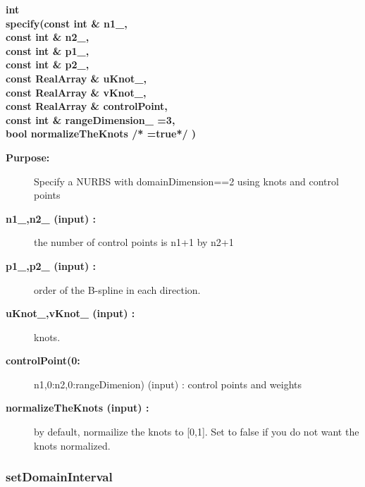 \begin{flushleft} \textbf{%
int  \\ 
\settowidth{\NurbsMappingIncludeArgIndent}{specify(}%
specify(const int \& n1\_, \\ 
\hspace{\NurbsMappingIncludeArgIndent}const int \& n2\_,\\ 
\hspace{\NurbsMappingIncludeArgIndent}const int \& p1\_, \\ 
\hspace{\NurbsMappingIncludeArgIndent}const int \& p2\_, \\ 
\hspace{\NurbsMappingIncludeArgIndent}const RealArray \& uKnot\_, \\ 
\hspace{\NurbsMappingIncludeArgIndent}const RealArray \& vKnot\_,\\ 
\hspace{\NurbsMappingIncludeArgIndent}const RealArray \& controlPoint,\\ 
\hspace{\NurbsMappingIncludeArgIndent}const int \& rangeDimension\_  =3,\\ 
\hspace{\NurbsMappingIncludeArgIndent}bool normalizeTheKnots /* =true*/  )
}\end{flushleft}
\begin{description}
\item[{\bf Purpose:}]  Specify a NURBS with domainDimension==2 using knots and control points
\item[{\bf n1\_,n2\_ (input) :}]  the number of control points is n1+1 by n2+1
\item[{\bf p1\_,p2\_ (input) :}]  order of the B-spline in each direction.
\item[{\bf uKnot\_,vKnot\_ (input) :}]  knots.
\item[{\bf controlPoint(0:}] n1,0:n2,0:rangeDimenion) (input) : control points and weights
\item[{\bf normalizeTheKnots (input) :}]  by default, normailize the knots to [0,1]. Set to false
    if you do not want the knots normalized. 
\end{description}
\subsubsection{setDomainInterval}
 
